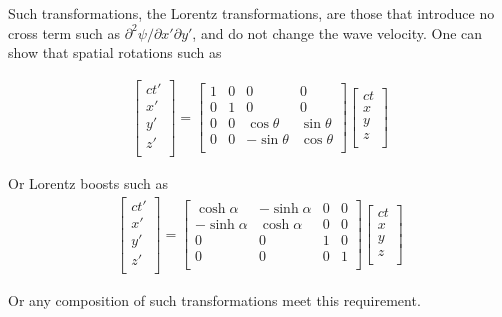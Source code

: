 Such transformations, the Lorentz transformations,
are those that introduce no cross term such as $\partial^2 \psi/\partial x' \partial y'$,
and do not change the wave velocity.  One can show that spatial rotations such as

\begin{align}
\begin{bmatrix}
ct' \\
x' \\
y' \\
z' \\
\end{bmatrix}
=
\begin{bmatrix}
1 & 0 & 0 & 0 \\
0 & 1 & 0 & 0 \\
0 & 0 & \cos\theta & \sin\theta \\
0 & 0 & -\sin\theta & \cos\theta \\
\end{bmatrix}
\begin{bmatrix}
ct \\
x \\
y \\
z \\
\end{bmatrix}
\end{align}

Or Lorentz boosts such as
\begin{align}
\begin{bmatrix}
ct' \\
x' \\
y' \\
z' \\
\end{bmatrix}
=
\begin{bmatrix}
\cosh\alpha & -\sinh\alpha & 0 & 0 \\
-\sinh\alpha & \cosh\alpha & 0 & 0 \\
0 & 0 & 1 & 0 \\
0 & 0 & 0 & 1 \\
\end{bmatrix}
\begin{bmatrix}
ct \\
x \\
y \\
z \\
\end{bmatrix}
\end{align}

Or any composition of such transformations meet this requirement.

